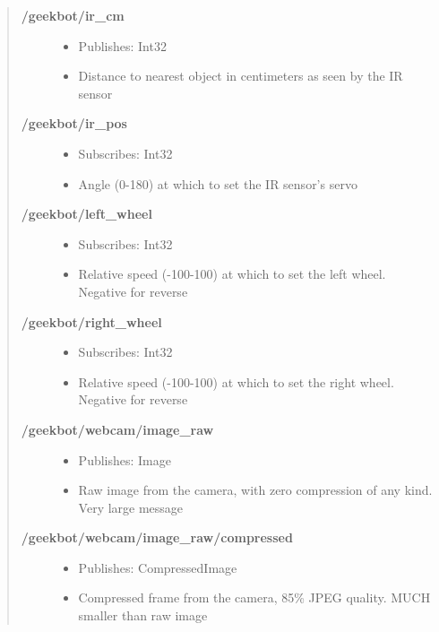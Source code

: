 \begin{quote}
\begin{description}
\item[\textbf{/geekbot/ir\_cm}]
\begin{itemize}
\tightlist
\item
  Publishes: Int32
\item
  Distance to nearest object in centimeters as seen by the IR sensor
\end{itemize}
\item[\textbf{/geekbot/ir\_pos}]
\begin{itemize}
\tightlist
\item
  Subscribes: Int32
\item
  Angle (0-180) at which to set the IR sensor's servo
\end{itemize}
\item[\textbf{/geekbot/left\_wheel}]
\begin{itemize}
\tightlist
\item
  Subscribes: Int32
\item
  Relative speed (-100-100) at which to set the left wheel. Negative for
  reverse
\end{itemize}
\item[\textbf{/geekbot/right\_wheel}]
\begin{itemize}
\tightlist
\item
  Subscribes: Int32
\item
  Relative speed (-100-100) at which to set the right wheel. Negative
  for reverse
\end{itemize}
\item[\textbf{/geekbot/webcam/image\_raw}]
\begin{itemize}
\tightlist
\item
  Publishes: Image
\item
  Raw image from the camera, with zero compression of any kind. Very
  large message
\end{itemize}
\item[\textbf{/geekbot/webcam/image\_raw/compressed}]
\begin{itemize}
\tightlist
\item
  Publishes: CompressedImage
\item
  Compressed frame from the camera, 85\% JPEG quality. MUCH smaller than
  raw image
\end{itemize}
\end{description}
\end{quote}

